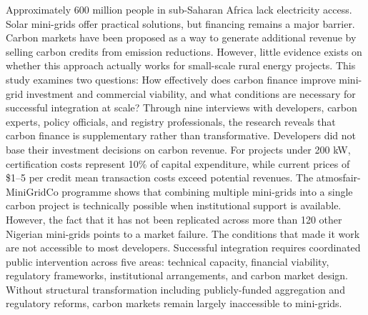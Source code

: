 Approximately 600 million people in sub-Saharan Africa lack electricity access. Solar mini-grids offer practical solutions, but financing remains a major barrier. Carbon markets have been proposed as a way to generate additional revenue by selling carbon credits from emission reductions. However, little evidence exists on whether this approach actually works for small-scale rural energy projects. This study examines two questions: How effectively does carbon finance improve mini-grid investment and commercial viability, and what conditions are necessary for successful integration at scale? Through nine interviews with developers, carbon experts, policy officials, and registry professionals, the research reveals that carbon finance is supplementary rather than transformative. Developers did not base their investment decisions on carbon revenue. For projects under 200 kW, certification costs represent 10\% of capital expenditure, while current prices of \$1--5 per credit mean transaction costs exceed potential revenues. The atmosfair-MiniGridCo programme shows that combining multiple mini-grids into a single carbon project is technically possible when institutional support is available. However, the fact that it has not been replicated across more than 120 other Nigerian mini-grids points to a market failure. The conditions that made it work are not accessible to most developers. Successful integration requires coordinated public intervention across five areas: technical capacity, financial viability, regulatory frameworks, institutional arrangements, and carbon market design. Without structural transformation including publicly-funded aggregation and regulatory reforms, carbon markets remain largely inaccessible to mini-grids.